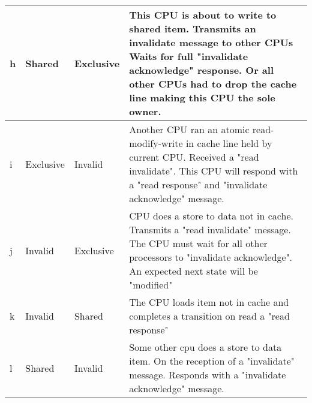 \documentclass{article}
\begin{document}
\begin{tabular} {| l | l | l | p{9cm}| }
    \\
    \hline
    h & Shared & Exclusive & 

    This CPU is about to write to shared item. Transmits an invalidate
    message to other CPUs Waits for full "invalidate acknowledge"
    response. Or all other CPUs had to drop the cache line making this
    CPU the sole owner. \\
    \hline
    i & Exclusive & Invalid & 

    Another CPU ran an atomic read-modify-write in cache line held by
    current CPU. Received a "read invalidate". This CPU will respond
    with a "read response" and "invalidate acknowledge" message.   \\

    \hline

    j & Invalid & Exclusive &

    CPU does a store to data not in cache. Transmits a "read
    invalidate" message. The CPU must wait for all other processors to
    "invalidate acknowledge". An expected next state will be
    "modified"  
    \\
    \hline

    k & Invalid & Shared &
    
    The CPU loads item not in cache and completes a transition on read
    a "read response"     \\


    \hline
    l & Shared & Invalid &
    
    Some other cpu does a store to data item. On the reception of a
    "invalidate" message. Responds with a "invalidate acknowledge"
    message. \\

    \hline    
\end{tabular}



\end{document}
